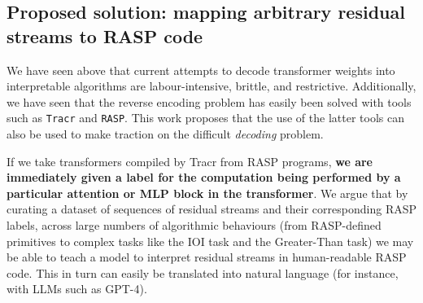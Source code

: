 \documentclass[11pt]{scrartcl}
\begin{document}
\subsection{Proposed solution: mapping arbitrary residual streams to RASP code}
We have seen above that current attempts to decode transformer weights into interpretable algorithms are labour-intensive, brittle, and restrictive. Additionally, we have seen that the reverse encoding problem has easily been solved with tools such as \texttt{Tracr} and \texttt{RASP}. This work proposes that the use of the latter tools can also be used to make traction on the difficult \textit{decoding} problem.


If we take transformers compiled by Tracr from RASP programs, \textbf{we are immediately given a label for the computation being performed by a particular attention or MLP block in the transformer}. We argue that by curating a dataset of sequences of residual streams and their corresponding RASP labels, across large numbers of algorithmic behaviours (from RASP-defined primitives to complex tasks like the IOI task and the Greater-Than task) we may be able to teach a model to interpret residual streams in human-readable RASP code. This in turn can easily be translated into natural language (for instance, with LLMs such as GPT-4). 
\end{document}
